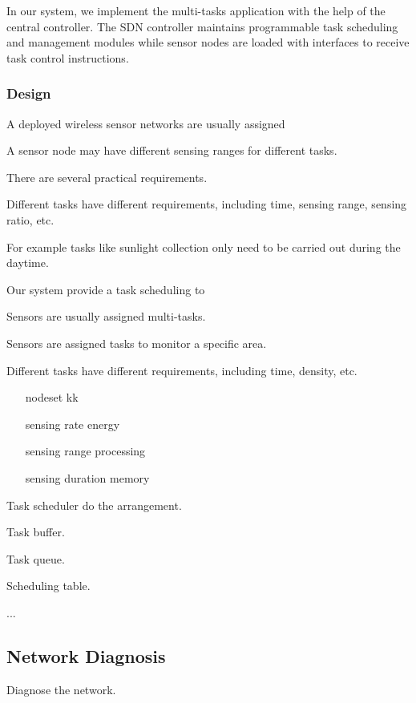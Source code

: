 In our {\sdn} system, we implement the multi-tasks application 
with the help of the central controller. The SDN controller
maintains programmable task scheduling and management
modules while sensor nodes are loaded with interfaces to
receive task control instructions.     

\subsubsection{Design}

A deployed wireless sensor networks are usually assigned  


A sensor node may have different sensing ranges for different tasks.


There are several practical requirements.

Different tasks have different requirements, including time, sensing range, sensing ratio, etc.

For example tasks like sunlight collection only need to be carried out during the daytime.

Our system provide a task scheduling to 

Sensors are usually assigned multi-tasks.

Sensors are assigned tasks to monitor a specific area.

Different tasks have different requirements, including time, density, etc.

\begin{itemize}
\item[nodeset] kk
\item[sensing rate] energy
\item[sensing range] processing
\item[sensing duration] memory
\end{itemize}

Task scheduler do the arrangement. 

Task buffer.

Task queue.

Scheduling table.

...

\subsection{Network Diagnosis}

Diagnose the network.
